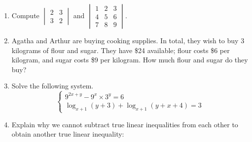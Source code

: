 \documentclass[a4paper,leqno]{article}
\numberwithin{equation}{section}
\theoremstyle{definition}
\theoremstyle{remark}
\begin{document}
\begin{enumerate}
\begin{center}
      \hspace*{\fill}
    \end{center}
  \item Compute $ \begin{vmatrix} 2 & 3\\3 & 2 \end{vmatrix} $ and $ \begin{vmatrix} 1 & 2 & 3 \\ 4 & 5 & 6 \\ 7 & 8 & 9 \end{vmatrix} $.
  \item Agatha and Arthur are buying cooking supplies. In total, they wish to buy 3 kilograms of flour and sugar. They
        have \$24 available; flour costs \$6 per kilogram, and sugar costs \$9 per kilogram. How much flour and sugar do they buy?
  \item Solve the following system.
        \begin{displaymath}
          \begin{cases}
          9^{2x+y} - 9^x \times 3^y = 6\\
          \log_{x+1}(y+3) + \log_{x+1}(y+x+4) = 3
          \end{cases}
        \end{displaymath}
  \item Explain why we cannot subtract true linear inequalities from each other to obtain another true linear inequality:

\end{enumerate}
\end{document}
